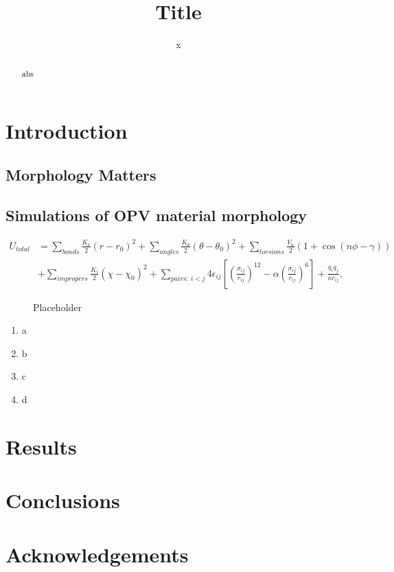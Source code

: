 \documentclass[journal = jacs, manuscript = article, layout=onecolumn]{achemso}
\author{x}
\affiliation{x}
\title{Title}
\begin{document}
\begin{abstract}
abs
\end{abstract}


\section{Introduction}

\subsection{Morphology Matters}

\subsection{Simulations of OPV material morphology}
\begin{align}
U_{total}&= \sum_{bonds} \frac{K_r}{2}(r-r_0)^2 + \sum_{angles} \frac{K_\theta}{2}(\theta-\theta_0)^2 + \sum_{torsions} \frac{V_n}{2}(1+\cos(n\phi-\gamma)) \nonumber \\
&+ \sum_{impropers} \frac{K_i}{2}(\chi-\chi_0)^2 + \sum_{pairs:~i<j} 4\epsilon_{ij}\left[ \left(\frac{\sigma_{ij}}{r_{ij}}\right)^{12}- \alpha\left(\frac{\sigma_{ij}}{r_{ij}}\right)^{6}\right] + \frac{q_iq_j}{\kappa r_{ij}},
\end{align}

\begin{figure}[tb]
\centering
\caption{\label{fig:zero} Placeholder}
\end{figure}

\begin{enumerate}
\item a
\item b
\item c
\item d
\end{enumerate}

\section{Results}

\section{Conclusions}

\section{Acknowledgements}


\end{document}
